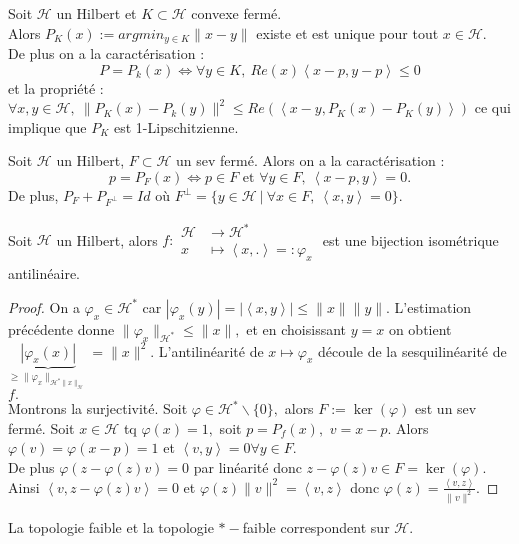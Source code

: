 \begin{remarque}
    Soit $\mathcal{H}$ un Hilbert et $K\subset \mathcal{H}$ convexe fermé. \\
    Alors $P_K(x):=argmin_{y\in K} \|x-y\|$  existe et est unique pour tout $x\in \mathcal{H}$. \\
    De plus on a la caractérisation : $$P=P_k(x)\Leftrightarrow \forall y\in K,\ Re(x)\left<x-p,y-p \right>\le 0 $$
et la propriété : $\forall x,y\in \mathcal{H},\ \|P_K(x)-P_k(y)\|^2\le Re\left( \left<x-y,P_K(x)-P_K (y)\right> \right) $ ce qui implique que $P_K$ est 1-Lipschitzienne.
\end{remarque}


\begin{propriete}
    Soit $\mathcal{H}$ un Hilbert, $F\subset \mathcal{H}$ un sev fermé. Alors on a la caractérisation :
$$p=P_F(x)\Leftrightarrow p\in F \text{ et }\forall y\in F,\ \left<x-p,y \right> = 0. $$
De plus, $P_F+P_{F^\bot}=Id$ où $F^\bot=\{y\in \mathcal{H}\ |\ \forall x\in F,\ \left<x,y \right> = 0 \} .$
\end{propriete}
\begin{corollaire}
    Soit $\mathcal{H}$ un Hilbert, alors $f :\begin{aligned}
        \mathcal{H} &\longrightarrow \mathcal{H}^* \\
        x &\longmapsto \left<x,. \right> =:\varphi _x
    \end{aligned}$ est une bijection isométrique antilinéaire.
\end{corollaire}
\begin{proof}
    On a $\varphi _x\in \mathcal{H}^*$ car $|\varphi _x(y)|=|\left<x,y \right>|\le \|x\|\|y\|$. L'estimation précédente donne  $\|\varphi _x\|_{\mathcal{H}^*}\le \|x\|,$ et en choisissant $y=x$ on obtient $\underbrace{|\varphi _x(x)| }_{\ge \|\varphi _x\|_{\mathcal{H}^*\|x\|_\mathcal{H}}}=\|x\|^2$. L'antilinéarité de $x\mapsto \varphi _x$ découle de la sesquilinéarité de $f.$ \\
    Montrons la surjectivité. Soit $\varphi \in \mathcal{H}^*\backslash \{0\} ,$ alors $F:=\ker(\varphi )$ est un sev fermé. Soit $x\in \mathcal{H}$ tq $\varphi (x)=1,$ soit $p=P_f(x),$ $v=x-p.$ Alors $\varphi (v)=\varphi (x-p)=1$ et $\left<v,y \right> = 0\forall y\in F.  $ \\
    De plus $\varphi (z-\varphi (z)v)=0$ par linéarité donc $z-\varphi (z)v\in F=\ker(\varphi).$\\
    Ainsi $\left<v,z-\varphi (z)v \right> = 0$ et $\varphi (z)\|v\|^2=\left<v,z \right>$ donc $\varphi (z)=\frac{\left<v,z \right>}{\|v\|^2}.$
\end{proof}
\begin{remarque}
    La topologie faible et la topologie $*-$faible correspondent sur $\mathcal{H}.$
\end{remarque}

